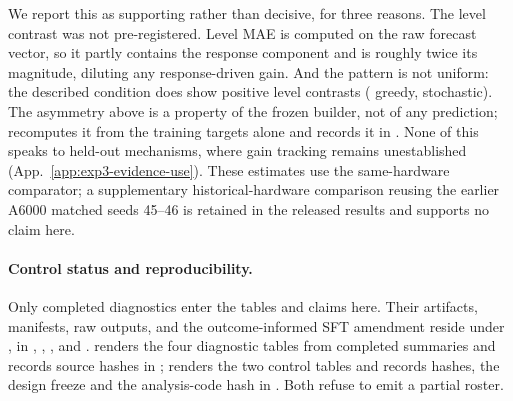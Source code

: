 We report this as supporting rather than decisive, for three reasons. The
level contrast was not pre-registered. Level MAE is computed on the raw
forecast vector, so it partly contains the response component and is roughly
twice its magnitude, diluting any response-driven gain. And the pattern is not
uniform: the described condition does show positive level contrasts
(\eShufDiscGreedyLevelEst{} greedy, \eShufDiscStochLevelEst{} stochastic). The
asymmetry above is a property of the frozen builder, not of any prediction;
 recomputes it from the training targets
alone and records it in . None of this speaks
to held-out mechanisms, where gain tracking remains unestablished
(App.~\ref{app:exp3-evidence-use}). These estimates use the same-hardware
comparator; a supplementary historical-hardware comparison reusing the earlier
A6000 matched seeds 45--46 is retained in the released results and supports no
claim here.

\paragraph{Control status and reproducibility.}
Only completed diagnostics enter the tables and claims here. Their artifacts,
manifests, raw
outputs, and the outcome-informed SFT amendment reside under
, in
, , , and
.
 renders the four diagnostic
tables from completed summaries and records source hashes in
;
 renders the two control
tables and records hashes, the design freeze and the analysis-code hash in
. Both refuse to emit a
partial roster.
